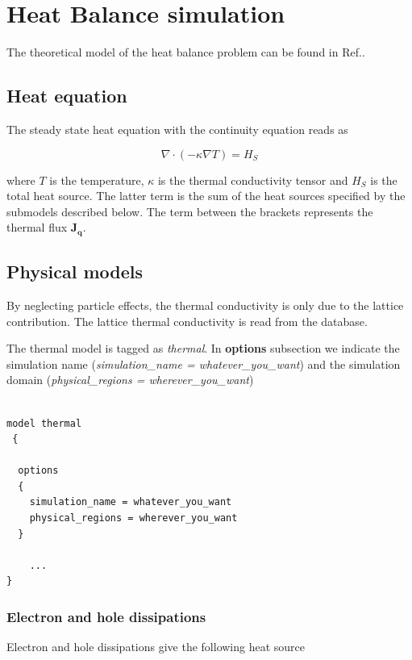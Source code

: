 \chapter{Heat Balance simulation}

The theoretical model of the heat balance problem can be found in Ref.\cite{wachutka}. 
\section{Heat equation}
The steady state heat equation with the continuity equation reads as

\begin{equation}\label{heat_law}
\nabla \cdot\left(- \kappa \nabla T  \right) = H_S
\end{equation}

where $T$ is the temperature, $\kappa$ is the thermal conductivity tensor and $H_S$ is the total heat source.
The latter term is the sum of the heat sources specified by the submodels described below. The term between the brackets represents the thermal flux $\mathbf{J_q}$.

\section{Physical models}

By neglecting particle effects, the thermal conductivity is only due to the lattice contribution. The lattice thermal conductivity is read from the database.

The thermal model is tagged as \textit{thermal}. In \textbf{options} subsection we indicate the simulation name (\textit{simulation\_name = whatever\_you\_want}) and the simulation domain (\textit{physical\_regions = wherever\_you\_want})


\begin{verbatim}

model thermal
 {

  options
  { 
    simulation_name = whatever_you_want
    physical_regions = wherever_you_want
  }

    ...
}

\end{verbatim}


\subsection{Electron and hole dissipations}


Electron and hole dissipations give the following heat source



